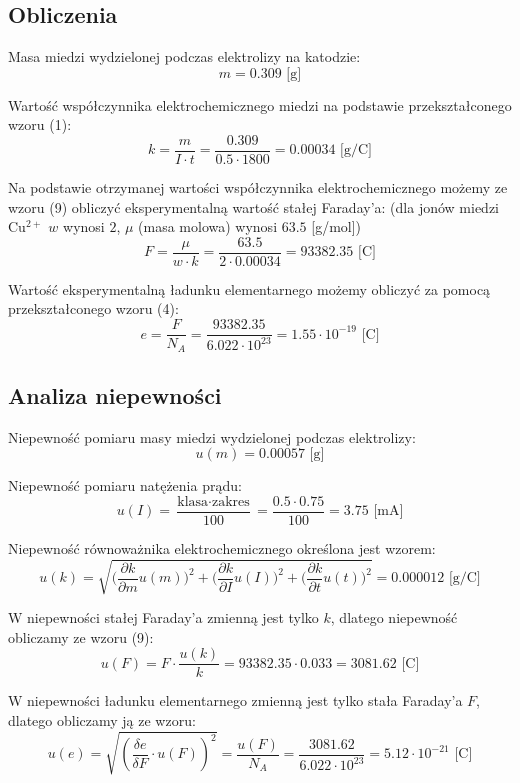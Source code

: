 \documentclass[a4paper,12pts]{article}
\begin{document}
\subsection{Obliczenia}

	Masa miedzi wydzielonej podczas elektrolizy na katodzie:
	$$m = 0.309 \textrm{ [g]}$$
	
	Wartość współczynnika elektrochemicznego miedzi na podstawie przekształconego wzoru (1): 
	$$k = \frac{m}{I \cdot t} = \frac{0.309}{0.5 \cdot 1800} = 0.00034 \textrm{ [g/C]}$$
	
	Na podstawie otrzymanej wartości współczynnika elektrochemicznego możemy ze wzoru (9) obliczyć eksperymentalną wartość stałej Faraday'a: (dla jonów miedzi Cu$^{2+}$ $w$ wynosi $2$, $\mu$ (masa molowa) wynosi $63.5$ [g/mol])
	$$F = \frac{\mu}{w \cdot k} = \frac{63.5}{2 \cdot 0.00034} = 93382.35 \textrm{ [C]}$$
	
	Wartość eksperymentalną ładunku elementarnego możemy obliczyć za pomocą przekształconego wzoru (4):
	$$e = \frac{F}{N_A} = \frac{93382.35}{6.022 \cdot 10^{23}} = 1.55 \cdot 10^{-19} \textrm{ [C]}$$
	
	
	\subsection{Analiza niepewności}
	
	Niepewność pomiaru masy miedzi wydzielonej podczas elektrolizy:
	$$u(m) = 0.00057 \textrm{ [g]}$$
	
	Niepewność pomiaru natężenia prądu:
	$$u(I) = \frac{\textrm{klasa} \cdot \textrm{zakres}}{100} = \frac{0.5 \cdot 0.75}{100} = 3.75 \textrm{ [mA]}$$
	
	Niepewność równoważnika elektrochemicznego określona jest wzorem:
	$$u(k) = \sqrt{\bigg(\frac{\partial k}{\partial m}u(m)\bigg)^2+\bigg(\frac{\partial k}{\partial I}u(I)\bigg)^2+\bigg(\frac{\partial k}{\partial t}u(t)\bigg)^2} = 0.000012 \textrm{ [g/C]}$$
	
	W niepewności stałej Faraday'a zmienną jest tylko $k$, dlatego niepewność obliczamy ze wzoru (9):
	$$u(F) = F \cdot \frac{u(k)}{k} = 93382.35 \cdot 0.033 = 3081.62 \textrm{ [C]}$$
		
	W niepewności ładunku elementarnego zmienną jest tylko stała Faraday'a $F$, dlatego obliczamy ją ze wzoru:
	$$u(e) = \sqrt{\left (\frac{\delta e}{\delta F} \cdot u(F) \right)^2} = \frac{u(F)}{N_A} = \frac{3081.62}{6.022 \cdot 10^23} = 5.12 \cdot 10^{-21} \textrm{ [C]}$$	
	
\end{document}
